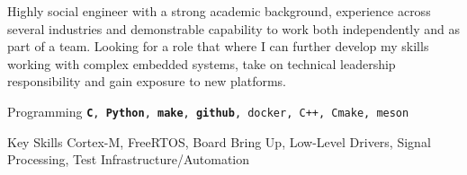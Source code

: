 
    Highly social engineer with a strong academic background, experience across several industries and demonstrable capability to work both independently and as part of a team.
    Looking for a role that where I can further develop my skills working with complex embedded systems, take on technical leadership responsibility and gain exposure to new platforms.

\begin{cvskills}

  \cvskill
    {Programming} %
    {\texttt{\textbf{C}, \textbf{Python}, \textbf{make}, \textbf{github}, docker, C++, Cmake, meson}} %

  \cvskill
    {Key Skills} %
    {Cortex-M, FreeRTOS, Board Bring Up, Low-Level Drivers, Signal Processing, Test Infrastructure/Automation} %

\end{cvskills}
